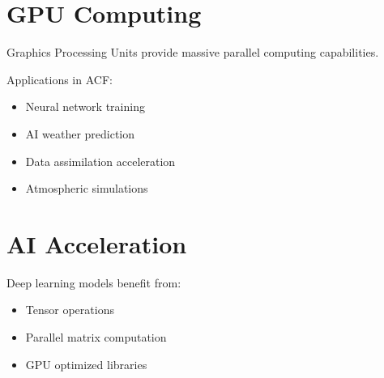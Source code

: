 \section{GPU Computing}


Graphics Processing Units provide massive parallel computing
capabilities.



Applications in ACF:


\begin{itemize}

\item Neural network training

\item AI weather prediction

\item Data assimilation acceleration

\item Atmospheric simulations

\end{itemize}



\section{AI Acceleration}


Deep learning models benefit from:


\begin{itemize}

\item Tensor operations

\item Parallel matrix computation

\item GPU optimized libraries

\end{itemize}
